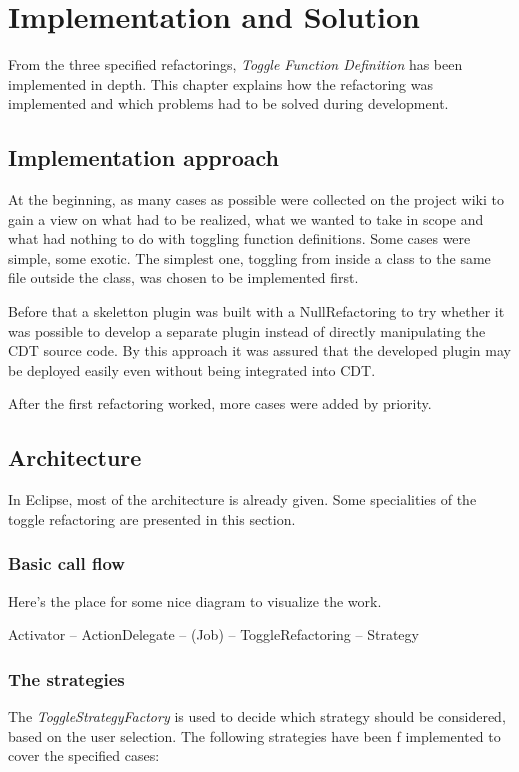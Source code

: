 \chapter{Implementation and Solution}
\thispagestyle{fancy}

From the three specified refactorings, \textit{Toggle Function Definition} has 
been implemented in depth. This chapter explains how the refactoring was 
implemented and which problems had to be solved during development.

\section{Implementation approach}

At the beginning, as many cases as possible were collected on the project wiki to gain a view on what had to be realized, what we wanted to take in scope and what had nothing to do with toggling function definitions. Some cases were simple, some exotic. The simplest one, toggling from inside a class to the same file outside the class, was chosen to be implemented first. 

Before that a skeletton plugin was built with a NullRefactoring to try whether it was possible to develop a separate plugin instead of directly manipulating the CDT source code. By this approach it was assured that the developed plugin may be deployed easily even without being integrated into CDT.

After the first refactoring worked, more cases were added by priority.

\section{Architecture}

In Eclipse, most of the architecture is already given. Some specialities of the 
toggle refactoring are presented in this section.

\subsection{Basic call flow}
Here's the place for some nice diagram to visualize the work.

Activator -- ActionDelegate -- (Job) -- ToggleRefactoring -- Strategy

\subsection{The strategies}
The \textit{ToggleStrategyFactory} is used to decide which strategy should be 
considered, based on the user selection. The following strategies have been f
implemented to cover the specified cases:


